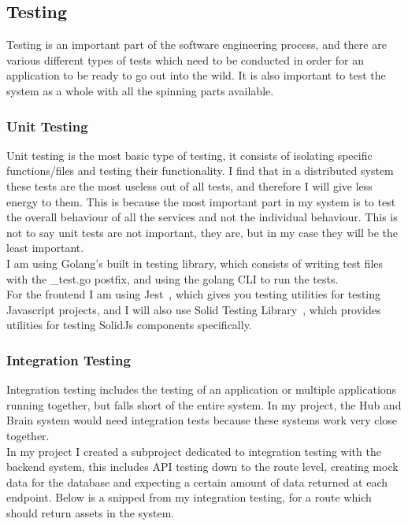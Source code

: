 \documentclass[titlepage]{article}
\begin{document}
\subsection{Testing}
Testing is an important part of the software engineering process, and there are various different types of tests which need to be conducted in order for an application to be ready to go out into the wild. It is also important to test the system as a whole with all the spinning parts available.

\subsubsection{Unit Testing}
Unit testing is the most basic type of testing, it consists of isolating specific functions/files and testing their functionality. I find that in a distributed system these tests are the most useless out of all tests, and therefore I will give less energy to them. This is because the most important part in my system is to test the overall behaviour of all the services and not the individual behaviour. This is not to say unit tests are not important, they are, but in my case they will be the least important. \\

I am using Golang's built in testing library, which consists of writing test files with the \_test.go postfix, and using the golang CLI to run the tests. \\

For the frontend I am using Jest~\cite{jest}, which gives you testing utilities for testing Javascript projects, and I will also use Solid Testing Library~\cite{solid_testing}, which provides utilities for testing SolidJs components specifically.

\subsubsection{Integration Testing}
Integration testing includes the testing of an application or multiple applications running together, but falls short of the entire system. In my project, the Hub and Brain system would need integration tests because these systems work very close together. \\

In my project I created a subproject dedicated to integration testing with the backend system, this includes API testing down to the route level, creating mock data for the database and expecting a certain amount of data returned at each endpoint. Below is a snipped from my integration testing, for a route which should return assets in the system.
\end{document}
